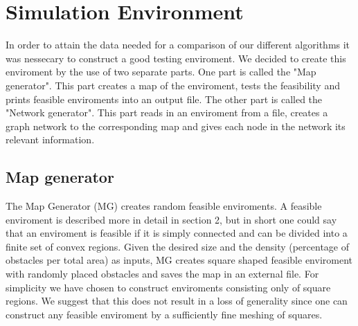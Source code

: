 \chapter{Simulation Environment}
In order to attain the data needed for a comparison of our different algorithms it was nessecary to construct a good testing enviroment. We decided to create this enviroment by the use of two separate parts. One part is called the "Map generator". This part creates a map of the enviroment, tests the feasibility and prints feasible enviroments into an output file. The other part is called the "Network generator". This part reads in an enviroment from a file, creates a graph network to the corresponding map and gives each node in the network its relevant information.\\

\section{Map generator}
The Map Generator (MG) creates random feasible enviroments. A feasible enviroment is described more in detail in section 2, but in short one could say that an enviroment is feasible if it is simply connected and can be divided into a finite set of convex regions. Given the desired size and the density (percentage of obstacles per total area) as inputs, MG creates square shaped feasible enviroment with randomly placed obstacles and saves the map in an external file. For simplicity we have chosen to construct enviroments consisting only of square regions. We suggest that this does not result in a loss of generality since one can construct any feasible enviroment by a sufficiently fine meshing of squares. \\

